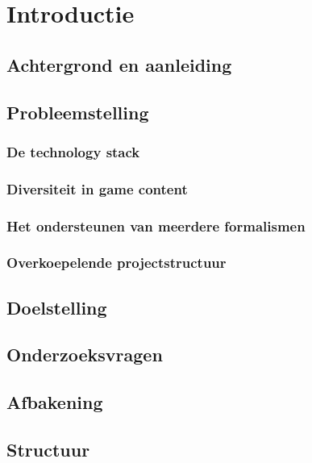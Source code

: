 \chapter{Introductie}

\section{Achtergrond en aanleiding}


\section{Probleemstelling}


\subsection{De technology stack}


\subsection{Diversiteit in game content}


\subsection{Het ondersteunen van meerdere formalismen}


\subsection{Overkoepelende projectstructuur}


\section{Doelstelling}


\section{Onderzoeksvragen}


\section{Afbakening}


\section{Structuur}